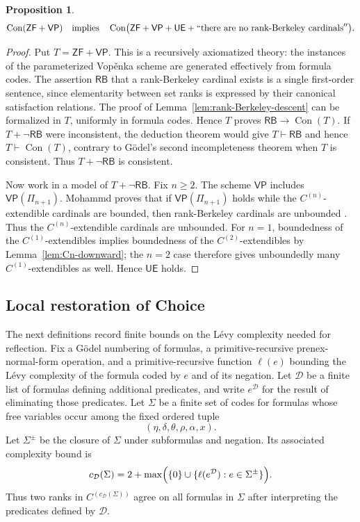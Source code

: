 \documentclass[11pt,a4paper]{amsart}
\newcommand{\VP}{\mathsf{VP}}
\newcommand{\ZF}{\mathsf{ZF}}
\newcommand{\Con}{\operatorname{Con}}
\newcommand{\UE}{\mathsf{UE}}
\theoremstyle{plain}
\newtheorem{proposition}[theorem]{Proposition}
\theoremstyle{definition}
\theoremstyle{remark}
\begin{document}
\begin{proposition}\label{prop:OH-pruning}
\[
\Con(\ZF+\VP)\quad\text{implies}\quad
\Con\bigl(\ZF+\VP+\UE+``\text{there are no rank-Berkeley cardinals}''\bigr).
\]
\end{proposition}

\begin{proof}
Put $T=\ZF+\VP$.  This is a recursively axiomatized theory: the instances of the parameterized Vop\v{e}nka scheme are generated effectively from formula codes.  The assertion $\mathsf{RB}$ that a rank-Berkeley cardinal exists is a single first-order sentence, since elementarity between set ranks is expressed by their canonical satisfaction relations.  The proof of Lemma~\ref{lem:rank-Berkeley-descent} can be formalized in $T$, uniformly in formula codes.  Hence $T$ proves $\mathsf{RB}\longrightarrow\Con(T)$.
If $T+\neg\mathsf{RB}$ were inconsistent, the deduction theorem would give $T\vdash\mathsf{RB}$ and hence $T\vdash\Con(T)$, contrary to G\"odel's second incompleteness theorem when $T$ is consistent.  Thus $T+\neg\mathsf{RB}$ is consistent.

{Now work in a model of $T+\neg\mathsf{RB}$.  Fix $n\geq2$.  {The scheme $\VP$ includes $\VP(\Pi_{n+1})$.}  Mohammd proves that if $\VP(\Pi_{n+1})$ holds while the $C^{(n)}$-extendible cardinals are bounded, then rank-Berkeley cardinals are unbounded \cite[Proposition~6.5 and Theorem~6.7]{Mohammd}.}  Thus the $C^{(n)}$-extendible cardinals are unbounded.  For $n=1$, boundedness of the $C^{(1)}$-extendibles implies boundedness of the $C^{(2)}$-extendibles by Lemma~\ref{lem:Cn-downward}; the $n=2$ case therefore gives unboundedly many $C^{(1)}$-extendibles as well.  Hence $\UE$ holds.
\end{proof}

\subsection*{{Local restoration of Choice}}

\begingroup

The next definitions record finite bounds on the L\'evy complexity needed for reflection.  Fix a G\"odel numbering of formulas, a primitive-recursive prenex-normal-form operation, and a primitive-recursive function $\ell(e)$ bounding the L\'evy complexity of the formula coded by $e$ and of its negation.  Let $\mathcal D$ be a finite list of formulas defining additional predicates, and write $e^{\mathcal D}$ for the result of eliminating those predicates.  Let $\Sigma$ be a finite set of codes for formulas whose free variables occur among the fixed ordered tuple
\[
(\eta,\delta,\theta,\rho,\alpha,x).
\]
Let $\Sigma^{\pm}$ be the closure of $\Sigma$ under subformulas and negation.  Its associated complexity bound is
\[
c_{\mathcal D}(\Sigma)=2+\max\Bigl(\{0\}\cup
\{\ell(e^{\mathcal D}):e\in\Sigma^{\pm}\}\Bigr).
\]
Thus two ranks in $C^{(c_{\mathcal D}(\Sigma))}$ agree on all formulas in $\Sigma$ after interpreting the predicates defined by $\mathcal D$.
\end{document}
